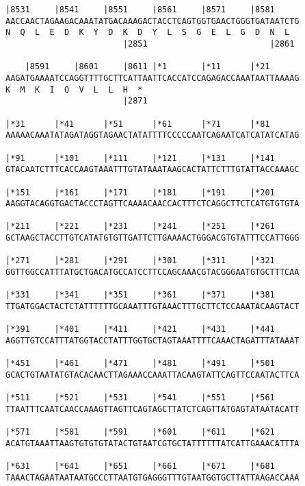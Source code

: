\documentclass{article}
\begin{document}
\begin{Verbatim}[fontfamily=courier]
    |8531     |8541     |8551     |8561     |8571     |8581 
AACCAACTAGAAGACAAATATGACAAAGACTACCTCAGTGGTGAACTGGGTGATAATCTG
N  Q  L  E  D  K  Y  D  K  D  Y  L  S  G  E  L  G  D  N  L  
                        |2851                         |2861 

    |8591     |8601     |8611 |*1       |*11      |*21      
AAGATGAAAATCCAGGTTTTGCTTCATTAATTCACCATCCAGAGACCAAATAATTAAAAG
K  M  K  I  Q  V  L  L  H  *   
                        |2871                               

|*31      |*41      |*51      |*61      |*71      |*81      
AAAAACAAATATAGATAGGTAGAACTATATTTTCCCCCAATCAGAATCATCATATCATAG

|*91      |*101     |*111     |*121     |*131     |*141     
GTACAATCTTTCACCAAGTAAATTTGTATAAATAAGCACTATTCTTTGTATTACCAAAGC

|*151     |*161     |*171     |*181     |*191     |*201     
AAGGTACAGGTGACTACCCTAGTTCAAAACAACCACTTTCTCAGGCTTCTCATGTGTGTA

|*211     |*221     |*231     |*241     |*251     |*261     
GCTAAGCTACCTTGTCATATGTGTTGATTCTTGAAAACTGGGACGTGTATTTCCATTGGG

|*271     |*281     |*291     |*301     |*311     |*321     
GGTTGGCCATTTATGCTGACATGCCATCCTTCCAGCAAACGTACGGGAATGTGCTTTCAA

|*331     |*341     |*351     |*361     |*371     |*381     
TTGATGGACTACTCTATTTTTTGCAAATTTGTAAACTTTGCTTCTCCAAATACAAGTACT

|*391     |*401     |*411     |*421     |*431     |*441     
AGGTTGTCCATTTATGGTACCTATTTGGTGCTAGTAAATTTTCAAACTAGATTTATAAAT

|*451     |*461     |*471     |*481     |*491     |*501     
GCACTGTAATATGTACACAACTTAGAAACCAAATTACAAGTATTCAGTTCCAATACTTCA

|*511     |*521     |*531     |*541     |*551     |*561     
TTAATTTCAATCAACCAAAGTTAGTTCAGTAGCTTATCTCAGTTATGAGTATAATACATT

|*571     |*581     |*591     |*601     |*611     |*621     
ACATGTAAATTAAGTGTGTGTATACTGTAATCGTGCTATTTTTTATCATTGAAACATTTA

|*631     |*641     |*651     |*661     |*671     |*681     
TAAACTAGAATAATAATGCCCTTAATGTGAGGGTTTGTAATGGTGCTTATTAAGACCAAA

\end{Verbatim}
\newpage
\end{document}
